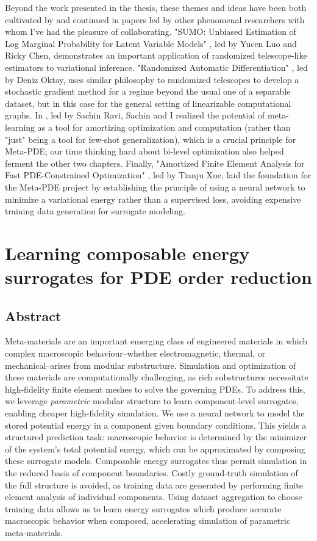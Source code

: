 \documentclass{puthesis}
\begin{document}
Beyond the work presented in the thesis, these themes and ideas have been
both cultivated by and continued in papers led by
other phenomenal researchers with whom I've had the pleasure of collaborating.
"SUMO: Unbiased Estimation of Log Marginal Probability for Latent
Variable Models" \citep{luo2019sumo},
led by Yucen Luo and Ricky Chen, demonstrates
an important application of randomized telescope-like estimators to
variational inference.
"Randomized Automatic Differentiation" \citep{oktay2021randomized},
led by Deniz Oktay, uses similar philosophy to
randomized telescopes to develop a stochastic gradient method for a
regime beyond the usual one of a separable dataset,
but in this case for the general setting of linearizable computational graphs.
In \citep{ravi2018amortized},
led by Sachin Ravi, Sachin and I
realized the potential of meta-learning as a tool for amortizing
optimization and computation (rather than "just" being a tool for
few-shot generalization), which is a crucial principle for Meta-PDE;
our time thinking hard about bi-level optimization also
helped ferment the other two chapters.
Finally,
"Amortized Finite Element Analysis for Fast PDE-Constrained Optimization" \citep{xue2020amortized},
led by Tianju Xue, laid the foundation for the Meta-PDE
project by establishing the principle of using a neural network to
minimize a variational energy rather than a supervised loss,
avoiding expensive training data generation for surrogate modeling.


\chapter{Learning composable energy surrogates for PDE order reduction}

\section{Abstract}
Meta-materials are an important emerging class of engineered materials in which complex macroscopic behaviour--whether electromagnetic, thermal, or mechanical--arises from modular substructure.
Simulation and optimization of these materials are computationally challenging, as rich substructures necessitate high-fidelity finite element meshes to solve the governing PDEs.
To address this, we leverage \emph{parametric} modular structure to learn component-level surrogates, enabling cheaper high-fidelity simulation.
We use a neural network to model the stored potential energy in a component given boundary conditions. This yields a structured prediction task: macroscopic behavior is determined by the minimizer of the system's total potential energy, which can be approximated by composing these surrogate models. Composable energy surrogates thus permit simulation in the reduced basis of component boundaries. Costly ground-truth simulation of the full structure is avoided, as
training data are generated by performing finite element analysis of individual components. Using dataset aggregation to choose training data allows us to learn energy surrogates which produce accurate macroscopic behavior when composed, accelerating simulation of parametric meta-materials.
\end{document}
